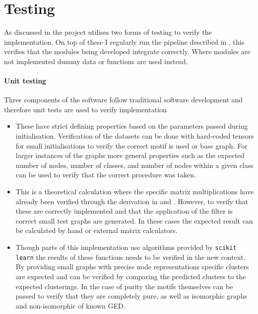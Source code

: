 \section{Testing}
\label{sec:testing-imp}
As discussed in  the project utilises two forms of testing to verify the implementation.
On top of these I regularly run the pipeline described in , this verifies that the modules being developed integrate correctly.
Where modules are not implemented dummy data or functions are used instead.

\paragraph{Unit testing}
Three components of the software follow traditional software development and therefore unit tests are used to verify implementation
\begin{itemize}
    \item[] 
        These have strict defining properties based on the parameters passed during initialisation.
        Verification of the datasets can be done with hard-coded tensors for small initialisations to verify the correct motif is used or base graph.
        For larger instances of the graphs more general properties such as the expected number of nodes, number of classes, and number of nodes within a given class can be used to verify that the correct procedure was taken.
    \item[] 
        This is a theoretical calculation where the specific matrix multiplications have already been verified through the derivation in  and .
        However, to verify that these are correctly implemented and that the application of the filter is correct small test graphs are generated.
        In these cases the expected result can be calculated by hand or external matrix calculators.
    \item[] 
        Though parts of this implementation use algorithms provided by \texttt{scikit learn}\cite{scikit-learn} the results of these functions needs to be verified in the new context.
        By providing small graphs with precise node representations specific clusters are expected and can be verified by comparing the predicted clusters to the expected clusterings.
        In the case of purity the motifs themselves can be passed to verify that they are completely pure, as well as isomorphic graphs and non-isomorphic of known GED.
\end{itemize}

